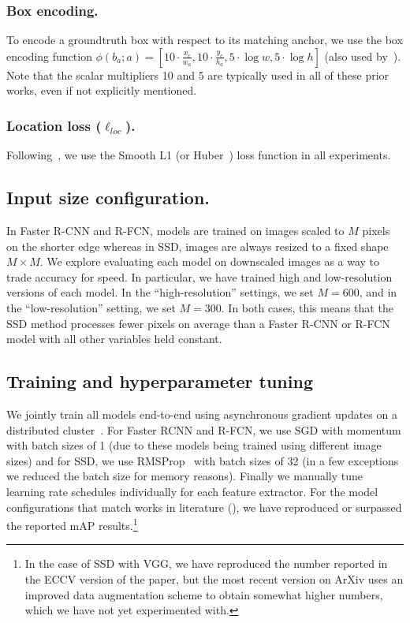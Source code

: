 \documentclass[10pt,twocolumn,letterpaper]{article}
\renewcommand{\paragraph}[1]{\subsubsection{#1}}
\begin{document}
\paragraph{Box encoding.} To encode a groundtruth box with respect to its matching anchor, we use the box encoding function $\phi(b_a; a)=[10\cdot\frac{x_c}{w_a}, 10\cdot\frac{y_c}{h_a}, 5\cdot\log w, 5\cdot\log h]$ (also used by~\cite{girshick2014rich,girshick2015fast,ren2015faster,liu2015ssd}). Note that the scalar multipliers 10 and 5 are typically used in all of these prior works, even if not explicitly mentioned.


\paragraph{Location loss ($\ell_{loc}$).} Following~\cite{girshick2015fast,ren2015faster,liu2015ssd}, we use the Smooth L1 (or Huber~\cite{huber1964robust}) loss function in all experiments.


\subsection{Input size configuration.}
In Faster R-CNN and R-FCN, models are trained on images scaled to $M$
pixels on the shorter edge whereas in SSD,  images are always resized
to a fixed shape $M\times M$.  We explore evaluating each model on
downscaled images as a way to trade accuracy for speed.  In particular, we have trained high and low-resolution versions of each model.  
In the ``high-resolution'' settings, we set $M=600$, and in the ``low-resolution'' setting, we set $M=300$.  In both cases, this means that the SSD method processes  fewer pixels on average than a Faster R-CNN or R-FCN model with all other variables held constant.   


\subsection{Training and hyperparameter tuning}
We jointly train all models end-to-end using asynchronous gradient
updates on a distributed cluster~\cite{dean2012large}.  For Faster RCNN and R-FCN, 
we use SGD with momentum with batch sizes of 1 (due to these models being 
trained using different image sizes) and for 
SSD, we use RMSProp~\cite{tieleman2012lecture} with batch sizes of 32 (in a few 
exceptions we reduced the batch size for memory reasons).  Finally we 
manually tune learning rate schedules
individually for each feature extractor.  For the model configurations that match works in literature (\cite{ren2015faster,dai2016r,he2015deep,liu2015ssd}), we have reproduced or surpassed the reported mAP results.\footnote{In the case of SSD with VGG, we have reproduced the number reported in the ECCV version of the paper, but the most recent version on ArXiv uses an improved data augmentation scheme to obtain somewhat higher numbers, which we have not yet experimented with.}
\end{document}

